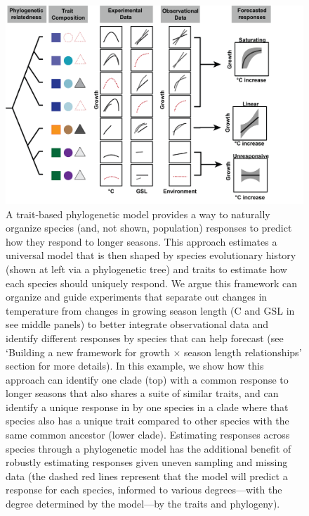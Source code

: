\documentclass[11pt]{article}
\begin{document}
\clearpage
\begin{figure}[h!]
\includegraphics[width=1\textwidth]{..//figures/phylomodel/phylomodel.png}
\caption{A trait-based phylogenetic model provides a way to naturally organize species (and, not shown, population) responses to predict how they respond to longer seasons. This approach estimates a universal model that is then shaped by species evolutionary history (shown at left via a phylogenetic tree) and traits to estimate how each species should uniquely respond. We argue this framework can organize and guide experiments that separate out changes in temperature from changes in growing season length (\degree C and GSL in see middle panels) to better integrate observational data and identify different responses by species that can help forecast (see `Building a new framework for growth $\times$ season length relationships' section for more details). In this example, we show how this approach can identify one clade (top) with a common response to longer seasons that also shares a suite of similar traits, and can identify a unique response in by one species in a clade where that species also has a unique trait compared to other species with the same common ancestor (lower clade). Estimating responses across species through a phylogenetic model has the additional benefit of robustly estimating responses given uneven sampling and missing data (the dashed red lines represent that the model will predict a response for each species, informed to various degrees---with the degree determined by the model---by the traits and phylogeny). }  %
\label{fig:phylomodel}
\end{figure}
\end{document}
